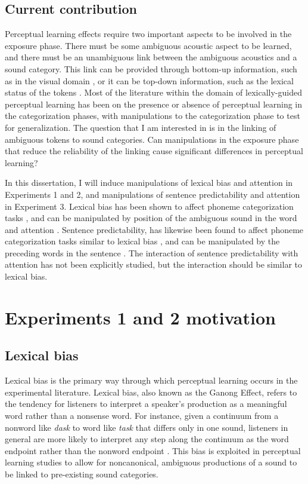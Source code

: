 \documentclass[11pt]{article} %
\begin{document}
\subsection{Current contribution}

Perceptual learning effects require two important aspects to be involved in the exposure phase.  
There must be some ambiguous acoustic aspect to be learned, and there must be an unambiguous link between the ambiguous acoustics and a sound category. 
This link can be provided through bottom-up information, such as in the visual domain \citep{Bertelson2003}, or it can be top-down information, such as the lexical status of the tokens \citep{Norris2003}. 
Most of the literature within the domain of lexically-guided perceptual learning has been on the presence or absence of perceptual learning in the categorization phases, with manipulations to the categorization phase to test for generalization.  
The question that I am interested in is in the linking of ambiguous tokens to sound categories.  
Can manipulations in the exposure phase that reduce the reliability of the linking cause significant differences in perceptual learning?

In this dissertation,  I will induce manipulations of lexical bias and attention in Experiments 1 and 2, and manipulations of sentence predictability and attention in Experiment 3. 
Lexical bias has been shown to affect phoneme categorization tasks \citep{Ganong1980}, and can be manipulated by position of the ambiguous sound in the word and attention \cite{Pitt2012}.  
Sentence predictability, has likewise been found to affect phoneme categorization tasks similar to lexical bias \citep{Borsky1998}, and can be manipulated by the preceding words in the sentence \citep{Kalikow1977}.  
The interaction of sentence predictability with attention has not been explicitly studied, but the interaction should be similar to lexical bias.

\section{Experiments 1 and 2 motivation}

\subsection{Lexical bias}

Lexical bias is the primary way through which perceptual learning occurs in the experimental literature.  Lexical bias, also known as the Ganong Effect, refers to the tendency for listeners to interpret a speaker's production as a meaningful word rather than a nonsense word.  For instance, given a continuum from a nonword like \emph{dask} to word like \emph{task} that differs only in one sound, listeners in general are more likely to interpret any step along the continuum as the word endpoint rather than the nonword endpoint \citep{Ganong1980}. This bias is exploited in perceptual learning studies to allow for noncanonical, ambiguous productions of a sound to be linked to pre-existing sound categories.
\end{document}
